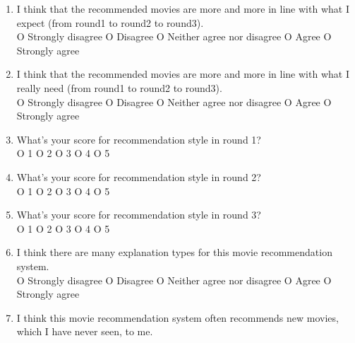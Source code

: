\begin{enumerate}
\item I think that the recommended movies are more and more in line with what I expect (from round1 to round2 to round3).\\

O Strongly disagree O Disagree O Neither agree nor disagree O Agree O Strongly agree

\item I think that the recommended movies are more and more in line with what I really need (from round1 to round2 to round3).\\

O Strongly disagree O Disagree O Neither agree nor disagree O Agree O Strongly agree

\item What's your score for recommendation style in round 1?\\

O 1 \hspace{2cm}O 2 \hspace{2cm}O 3 \hspace{2cm}O 4 \hspace{2cm}O 5

\item What's your score for recommendation style in round 2?\\

O 1 \hspace{2cm}O 2 \hspace{2cm}O 3 \hspace{2cm}O 4 \hspace{2cm}O 5

\item What's your score for recommendation style in round 3?\\

O 1 \hspace{2cm}O 2 \hspace{2cm}O 3 \hspace{2cm}O 4 \hspace{2cm}O 5

\item I think there are many explanation types for this movie recommendation system.\\

O Strongly disagree O Disagree O Neither agree nor disagree O Agree O Strongly agree

\item I think this movie recommendation system often recommends new movies, which I have never seen, to me.\\


\end{enumerate}
